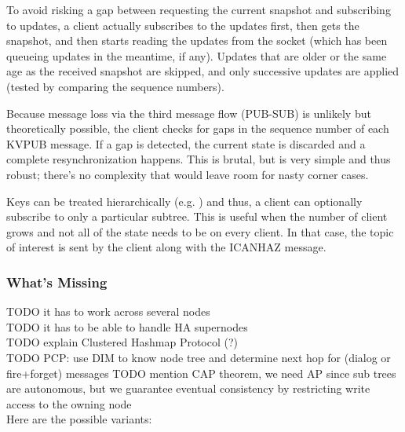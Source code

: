 To avoid risking a gap between requesting the current snapshot and subscribing
to updates, a client actually subscribes to the updates first, then gets the
snapshot, and then starts reading the updates from the socket (which has been
queueing updates in the meantime, if any). Updates that are older or the same
age as the received snapshot are skipped, and only successive updates are
applied (tested by comparing the sequence numbers).

Because message loss via the third message flow (PUB-SUB) is unlikely but
theoretically possible, the client checks for gaps in the sequence number of
each KVPUB message. If a gap is detected, the current state is discarded and a
complete resynchronization happens. This is brutal, but is very simple and thus
robust; there's no complexity that would leave room for nasty corner cases.

Keys can be treated hierarchically (e.g. ) and thus, a
client can optionally subscribe to only a particular subtree. This is useful
when the number of client grows and not all of the state needs to be on every
client. In that case, the topic of interest is sent by the client along with
the ICANHAZ message.

\subsubsection{What's Missing}
TODO it has to work across several nodes\\
TODO it has to be able to handle HA supernodes\\
TODO explain Clustered Hashmap Protocol (?)\\
TODO PCP: use DIM to know node tree and determine next hop for (dialog or fire+forget) messages
TODO mention CAP theorem, we need AP since sub trees are autonomous, but we guarantee eventual consistency by restricting write access to the owning node\\

Here are the possible variants:

